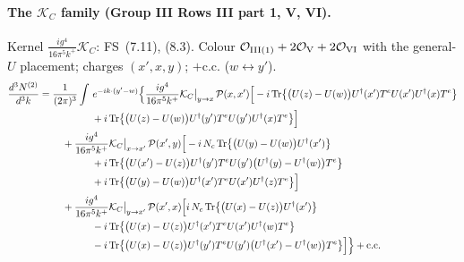 \documentclass[10pt]{article}
\numberwithin{equation}{section}
\newcommand{\OO}{\mathcal O}
\newcommand{\KK}{\mathcal K}
\newcommand{\PP}{\mathcal P}
\newcommand{\pre}{\frac{1}{(2\pi)^3}}
\begin{document}
\paragraph{The $\KK_C$ family (Group III Rows III part 1, V, VI).} Kernel $\frac{ig^4}{16\pi^5k^+}\KK_C$: FS~(7.11), (8.3). Colour $\OO_{\rm III(1)}+2\OO_{\rm V}+2\OO_{\rm VI}$ with the general-$U$ placement; charges $(x',x,y)$; $+$c.c. ($w\leftrightarrow y'$).
\begin{align}
\frac{d^3N^{(2)}}{d^3k}={}&\pre\int\,e^{-ik\cdot(y'-w)}\Big\{\frac{ig^4}{16\pi^5k^+}\KK_C\big|_{y\to x}\,\PP(x,x')\Big[-i\,{\rm Tr}\big\{\big(U(z)-U(w)\big)U^\dagger(x')T^eU(x')U^\dagger(x)T^e\big\}\notag\\
&\qquad\qquad+i\,{\rm Tr}\big\{\big(U(z)-U(w)\big)U^\dagger(y')T^eU(y')U^\dagger(x)T^e\big\}\Big]\notag\\
&\quad+\frac{ig^4}{16\pi^5k^+}\KK_C\big|_{x\to x'}\,\PP(x',y)\Big[-i\,N_c\,{\rm Tr}\big\{\big(U(y)-U(w)\big)U^\dagger(x')\big\}\notag\\
&\qquad\qquad+i\,{\rm Tr}\big\{\big(U(x')-U(z)\big)U^\dagger(y')T^eU(y')\big(U^\dagger(y)-U^\dagger(w)\big)T^e\big\}\notag\\
&\qquad\qquad+i\,{\rm Tr}\big\{\big(U(y)-U(w)\big)U^\dagger(x')T^eU(x')U^\dagger(z)T^e\big\}\Big]\notag\\
&\quad+\frac{ig^4}{16\pi^5k^+}\KK_C\big|_{y\to x'}\,\PP(x',x)\Big[i\,N_c\,{\rm Tr}\big\{\big(U(x)-U(z)\big)U^\dagger(x')\big\}\notag\\
&\qquad\qquad-i\,{\rm Tr}\big\{\big(U(x)-U(z)\big)U^\dagger(x')T^eU(x')U^\dagger(w)T^e\big\}\notag\\
&\qquad\qquad-i\,{\rm Tr}\big\{\big(U(x)-U(z)\big)U^\dagger(y')T^eU(y')\big(U^\dagger(x')-U^\dagger(w)\big)T^e\big\}\Big]\Big\}+{\rm c.c.}
\end{align}

\end{document}
